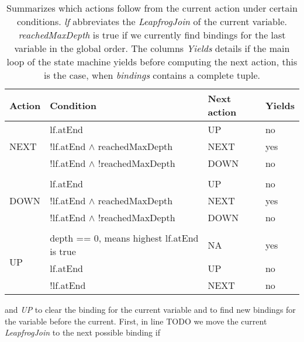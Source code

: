 \begin{table}[]
    \centering
    \begin{tabular}{@{}llll@{}}
        \toprule
        Action                & Condition                                  & Next action & Yields \\ \midrule
        \multirow{3}{*}{NEXT} & lf.atEnd                                   & UP          & no     \\
        & !lf.atEnd $\wedge$ reachedMaxDepth             & NEXT        & yes    \\
        & !lf.atEnd $\wedge$ !reachedMaxDepth            & DOWN        & no     \\
        & & &\\
        \multirow{3}{*}{DOWN} & lf.atEnd                                   & UP          & no     \\
        & !lf.atEnd $\wedge$ reachedMaxDepth             & NEXT        & yes    \\
        & !lf.atEnd $\wedge$ !reachedMaxDepth            & DOWN        & no     \\
        & & &\\
        \multirow{3}{*}{UP}     & depth == 0, means highest lf.atEnd is true & NA          & yes    \\
        & lf.atEnd                                   & UP          & no     \\
        & !lf.atEnd                                  & NEXT        & no     \\ \bottomrule
    \end{tabular}
    \caption{Summarizes which actions follow from the current action under certain conditions. \textit{lf} abbreviates the
    \textit{LeapfrogJoin} of the current variable.
    \textit{reachedMaxDepth} is true if we currently find bindings for the
    last variable in the global order.
    The columns \textit{Yields} details if the main loop of the state machine yields before computing the next action,
    this is the case, when \textit{bindings} contains a complete tuple.
    }
    \label{table:lftj-state-machine}
\end{table}



and \textit{UP}
to clear the binding for the current variable and to find new bindings for the variable before the current.
First, in line TODO we move the current \textit{LeapfrogJoin} to the next possible binding if


